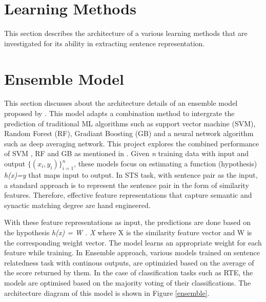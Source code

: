 \documentclass[12pt]{report} %
\begin{document}
\section*{Learning Methods}
This section describes the architecture of a various learning methods that are investigated for its ability in extracting sentence representation. 

\section{Ensemble Model}

	This section discusses about the architecture details of an ensemble model proposed by \cite{tian2017ecnu}. This model adapts a combination method to intergrate the prediction of traditional ML algorithms such as support vector machine (SVM), Random Forest (RF), Gradiant Boosting (GB) and a neural network algorithm such as deep averaging network. This project explores the combined performance of SVM , RF and GB as mentioned in \citep{tian2017ecnu}. Given \textit{n} training data with input and output $ \{(x_i,y_i)\}^{n}_{i=1} $, these models focus on estimating a function (hypothesis) \textit{h(x)=y} that maps input to output. In STS task, with sentence pair as the input, a standard approach is to represent the sentence pair in the form of similarity features. Therefore,  effective feature representations that capture semantic and synactic matching degree are hand engineered. 
	
	With these feature representations as input, the predictions are done based on the hypothesis \textit{h(x) = W . X} where X is the similarity feature vector and W is the corresponding weight vector.  The model learns an appropriate weight for each feature while training. In Ensemble approach, various models trained on sentence relatedness task with continous outputs, are optimizied based on the average of the score returned by them. In the case of classification tasks such as RTE, the models are optimised based on the majority voting of their classifications. The architecture diagram of this model is shown in Figure \ref{ensemble}.
	
\end{document}

